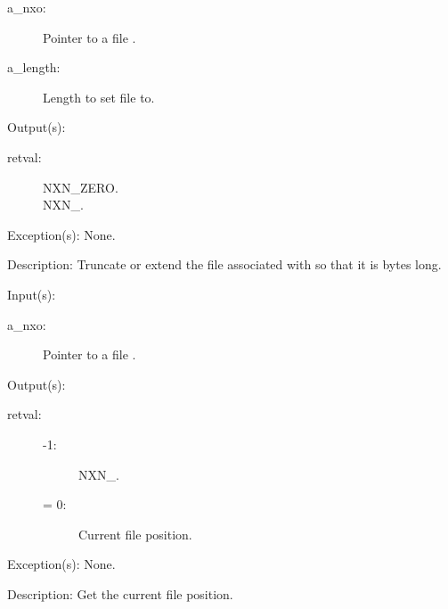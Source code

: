 \begin{capi}
\begin{capilist}
\begin{description}
		\item[a\_nxo: ]
			Pointer to a file .
		\item[a\_length: ]
			Length to set file to.
		\end{description}
	\item[Output(s): ]
		\begin{description}\item[]
		\item[retval: ]
			\begin{description}\item[]
			\item[NXN\_ZERO.]
			\item[NXN\_.]
			\end{description}
		\end{description}
	\item[Exception(s): ] None.
	\item[Description: ]
		Truncate or extend the file associated with  so
		that it is  bytes long.
	\end{capilist}
\label{nxo_file_position_get}
	\begin{capilist}
	\item[Input(s): ]
		\begin{description}\item[]
		\item[a\_nxo: ]
			Pointer to a file .
		\end{description}
	\item[Output(s): ]
		\begin{description}\item[]
		\item[retval: ]
			\begin{description}\item[]
			\item[-1: ]
				NXN\_.
			\item[{\gt}= 0: ]
				Current file position.
			\end{description}\item[]
		\end{description}
	\item[Exception(s): ] None.
	\item[Description: ]
		Get the current file position.
	\end{capilist}
\label{nxo_file_position_set}

\end{capi}
